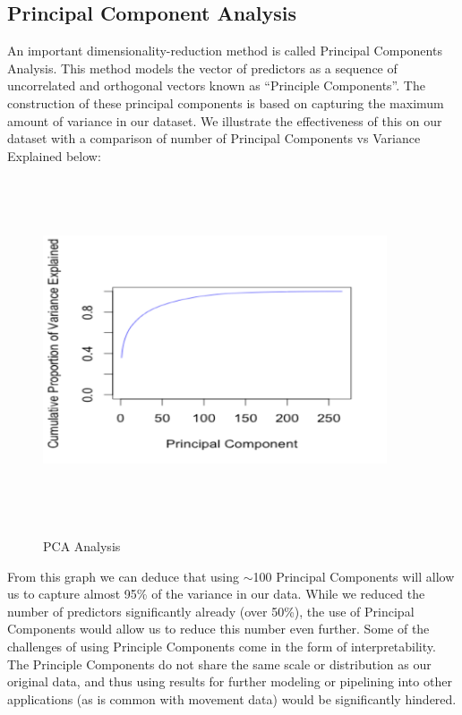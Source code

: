 \documentclass[12pt]{article}
\begin{document}
\subsection{Principal Component Analysis}
An important dimensionality-reduction method is called Principal Components Analysis. This method models the vector of predictors as a sequence of uncorrelated and orthogonal vectors known as “Principle Components”. The construction of these principal components is based on capturing the maximum amount of variance in our dataset. We illustrate the effectiveness of this on our dataset with a comparison of number of Principal Components vs Variance Explained below:
\begin{figure}[H]
\caption{PCA Analysis}
\centering
{\includegraphics[width=4in,height=4in,keepaspectratio]{PCAS}}
\end{figure}
 From this graph we can deduce that using $\sim$100 Principal Components will allow us to capture almost 95\% of the variance in our data. While we reduced the number of predictors significantly already (over 50\%), the use of Principal Components would allow us to reduce this number even further. Some of the challenges of using Principle Components come in the form of interpretability. \\
The Principle Components do not share the same scale or distribution as our original data, and thus using results for further modeling or pipelining into other applications (as is common with movement data) would be significantly hindered. 
\end{document}
